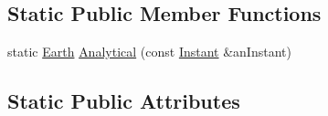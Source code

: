 \subsection*{Static Public Member Functions}
\begin{DoxyCompactItemize}
\item 
static \hyperlink{classlibrary_1_1physics_1_1env_1_1obj_1_1celest_1_1_earth}{Earth} \hyperlink{classlibrary_1_1physics_1_1env_1_1obj_1_1celest_1_1_earth_ae8e22cdc523ae85985949dd7a4e76d68}{Analytical} (const \hyperlink{classlibrary_1_1physics_1_1time_1_1_instant}{Instant} \&an\+Instant)
\end{DoxyCompactItemize}
\subsection*{Static Public Attributes}
